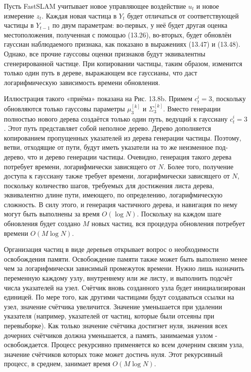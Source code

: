 \documentclass[10pt,a4paper]{article}
\begin{document}
Пусть FastSLAM учитывает новое управляющее воздействие $u_t$ и новое измерение $z_t$. Каждая новая частица в $Y_t$ будет отличаться от соответствующей частицы в $Y_{t-1}$ по двум параметрам: во-первых, у неё будет другая оценка местоположения, полученная с помощью (13.26), во-вторых, будет обновлён гауссиан наблюдаемого признака, как показано в выражениях (13.47) и (13.48). Однако, все прочие гауссовы оценки признаков будут эквивалентны сгенерированной частице. При копировании частицы, таким образом, изменится только один путь в дереве, выражающем все гауссианы, что даст логарифмическую зависимость времени обновления.

Иллюстрация такого «приёма» показана на Рис. 13.8b.  Примем
$c_t^i=3$, поскольку обновляются только гауссовы параметры $\mu_3^{[k]}$ и $\varSigma_3^{[k]}$. Вместо генерации полностью нового дерева создаётся только один путь, ведущий к гауссиану
$c_t^i=3$. Этот путь представляет собой неполное дерево. Дерево дополняется копированием пропущенных указателей из дерева генерации частицы. Поэтому, ветви, отходящие от пути, будут иметь указатели на то же неизменное под-дерево, что и дерево генерации частицы. Очевидно, генерация такого дерева потребует времени, логарифмически зависящего от $N$. Более того, получение доступа к гауссиану также требует времени, логарифмически зависящего от $N$, поскольку количество шагов, требуемых для достижения листа дерева, эквивалентно длине пути, имеющего, по определению, логарифмическую сложность. В силу этого, и генерация частичного дерева, и навигация по нему могут быть выполнены за время $O(\log N )$. Поскольку на каждом шаге обновления будет создано $M$ новых частиц, вся процедура обновления потребует времени $O(M \log N )$.

Организация частиц в виде деревьев открывает вопрос о необходимости освобождения памяти. Освобождение памяти также может быть выполнено менее чем за логарифмически зависимый промежуток времени. Нужно лишь назначить переменную каждому узлу, внутреннему или же листу, и выполнить подсчёт числа указателей на узел.  Счётчик вновь созданного узла будет инициализирован единицей. По мере того, как другими частицами будут создаваться ссылки на узел, значение счётчика увеличится. Значение уменьшается при удалении указателя (например, указателей от частиц, которые были отсеяны при перевыборке). Как только значение счётчика достигнет нуля, значения всех дочерних счётчиков должна уменьшается, а память, занимаемая узлом - освобождается. Процесс рекурсивно применяется ко всем дочерним связям узла, значение счётчиков которых тоже может достичь нуля. Этот рекурсивный процесс, в среднем, занимает время $O(M \log N )$.
\end{document}
